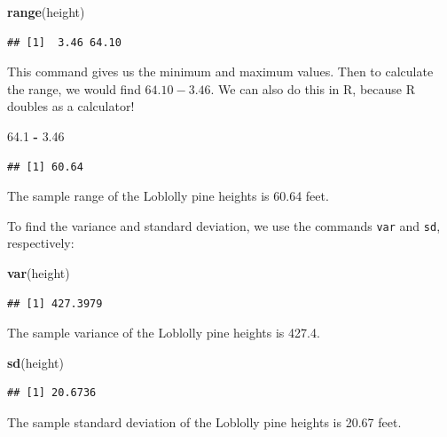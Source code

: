 \documentclass[
]{book}
\newenvironment{Shaded}{\begin{snugshade}}{\end{snugshade}}
\newcommand{\FloatTok}[1]{\textcolor[rgb]{0.00,0.00,0.81}{#1}}
\newcommand{\FunctionTok}[1]{\textcolor[rgb]{0.13,0.29,0.53}{\textbf{#1}}}
\newcommand{\NormalTok}[1]{#1}
\newcommand{\SpecialCharTok}[1]{\textcolor[rgb]{0.81,0.36,0.00}{\textbf{#1}}}
\begin{document}
\begin{Shaded}
\begin{Highlighting}[]
\FunctionTok{range}\NormalTok{(height)}
\end{Highlighting}
\end{Shaded}

\begin{verbatim}
## [1]  3.46 64.10
\end{verbatim}

This command gives us the minimum and maximum values. Then to calculate the range, we would find \(64.10 - 3.46\). We can also do this in R, because R doubles as a calculator!

\begin{Shaded}
\begin{Highlighting}[]
\FloatTok{64.1} \SpecialCharTok{{-}} \FloatTok{3.46}
\end{Highlighting}
\end{Shaded}

\begin{verbatim}
## [1] 60.64
\end{verbatim}

The sample range of the Loblolly pine heights is 60.64 feet.

To find the variance and standard deviation, we use the commands \texttt{var} and \texttt{sd}, respectively:

\begin{Shaded}
\begin{Highlighting}[]
\FunctionTok{var}\NormalTok{(height)}
\end{Highlighting}
\end{Shaded}

\begin{verbatim}
## [1] 427.3979
\end{verbatim}

The sample variance of the Loblolly pine heights is 427.4.

\begin{Shaded}
\begin{Highlighting}[]
\FunctionTok{sd}\NormalTok{(height)}
\end{Highlighting}
\end{Shaded}

\begin{verbatim}
## [1] 20.6736
\end{verbatim}

The sample standard deviation of the Loblolly pine heights is 20.67 feet.
\end{document}
